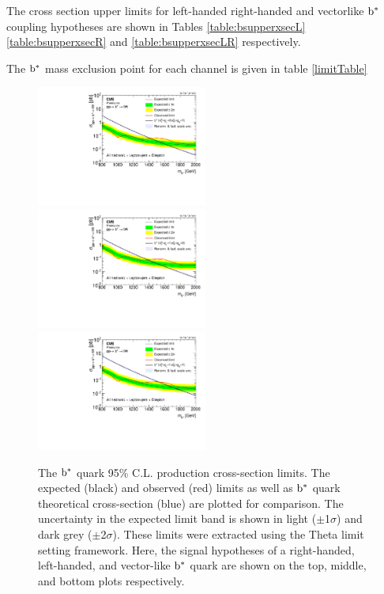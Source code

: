 The cross section upper limits for left-handed right-handed and vectorlike $\mathrm{b}^{*}$ coupling hypotheses are shown in Tables \ref{table:bsupperxsecL} \ref{table:bsupperxsecR} and \ref{table:bsupperxsecLR} respectively.

The $\mathrm{b}^{*}$ mass exclusion point for each channel is given in table \ref{limitTable}





\begin{figure}[htcb]
\centering
\includegraphics[width=0.5\textwidth]{AN-14-049/figs/bayesian_hadronic_semileptonic_right_limit_band_plot.pdf}\\
\includegraphics[width=0.5\textwidth]{AN-14-049/figs/bayesian_hadronic_semileptonic_left_limit_band_plot.pdf}\\
\includegraphics[width=0.5\textwidth]{AN-14-049/figs/bayesian_hadronic_semileptonic_vector_limit_band_plot.pdf}
\caption{The $\mathrm{b}^{*}$ quark 95\% C.L. production cross-section limits.  The expected (black) and observed (red) limits as well as $\mathrm{b}^{*}$ quark 
theoretical cross-section (blue) are plotted for comparison.  
The uncertainty in the expected limit band is shown in light ($\pm$1$\sigma$) and dark grey ($\pm$2$\sigma$).
These limits were extracted using the Theta limit setting framework.  Here, the signal hypotheses of a right-handed, left-handed, and vector-like $\mathrm{b}^{*}$ quark are 
shown on the top, middle, and bottom plots respectively. }
\label{figs:bsthetalimit}
\end{figure}

